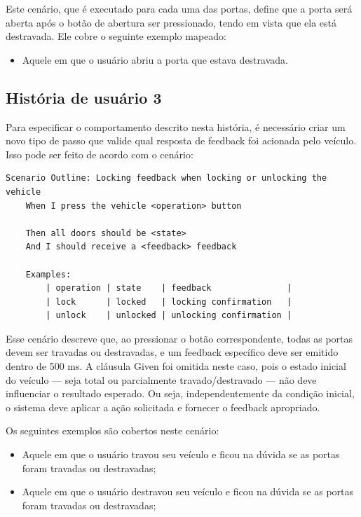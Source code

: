 Este cenário, que é executado para cada uma das portas, define que a porta será aberta após o botão de abertura ser pressionado, tendo em vista que ela 
está destravada. Ele cobre o seguinte exemplo mapeado:

\begin{itemize}
    \item Aquele em que o usuário abriu a porta que estava destravada.
\end{itemize}


\subsection{História de usuário 3}

Para especificar o comportamento descrito nesta história, é necessário criar um novo tipo de passo que valide qual resposta de feedback foi acionada pelo veículo. 
Isso pode ser feito de acordo com o cenário:

\begin{verbatim}
Scenario Outline: Locking feedback when locking or unlocking the vehicle
    When I press the vehicle <operation> button

    Then all doors should be <state>
    And I should receive a <feedback> feedback

    Examples:
        | operation | state    | feedback               |
        | lock      | locked   | locking confirmation   |
        | unlock    | unlocked | unlocking confirmation |
\end{verbatim}

Esse cenário descreve que, ao pressionar o botão correspondente, todas as portas devem ser travadas ou destravadas, e um feedback específico deve ser emitido 
dentro de 500 ms. A cláusula Given foi omitida neste caso, pois o estado inicial do veículo — seja total ou parcialmente travado/destravado — não deve influenciar 
o resultado esperado. Ou seja, independentemente da condição inicial, o sistema deve aplicar a ação solicitada e fornecer o feedback apropriado.

Os seguintes exemplos são cobertos neste cenário:

\begin{itemize}
    \item Aquele em que o usuário travou seu veículo e ficou na dúvida se as portas foram travadas ou destravadas;
    \item Aquele em que o usuário destravou seu veículo e ficou na dúvida se as portas foram travadas ou destravadas;
\end{itemize}

